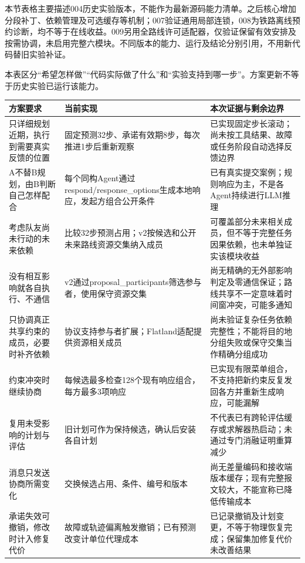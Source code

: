本节表格主要描述004历史实验版本，不能作为最新源码能力清单。之后核心增加分段补丁、依赖管理及可选缓存等机制；007验证通用局部连锁，008为铁路离线预约诊断，均不等于在线收益。009另用全路线许可适配器，仅验证保留有效安排及按需协调，未启用完整六模块。不同版本的能力、运行及结论分别引用，不用新代码替旧实验补证。

本表区分``希望怎样做''``代码实际做了什么''和``实验支持到哪一步''。方案更新不等于历史实验已运行该能力。

\begin{longtable}[]{@{}
  >{\raggedright\arraybackslash}p{}
  >{\raggedright\arraybackslash}p{}
  >{\raggedright\arraybackslash}p{}@{}}
\toprule
方案要求 & 当前实现 & 本次证据与剩余边界 \\
\midrule
\endhead
只详细规划近期，执行到需要真实反馈的位置 &
固定预测32步、承诺有效期8步，每次推进1步后重新观察 &
已实现固定步长滚动；尚未按工具结果、故障或任务阶段自动选择反馈边界 \\
A不替B规划，由B判断自己怎样配合 &
每个同构Agent通过respond/response\_options生成本地响应，发起方组合公开条件 &
已有真实提交案例；规则响应为主，不是各Agent持续进行LLM推理 \\
考虑队友尚未行动的未来依赖 & 比较32步预测占用；v2按候选和公开未来路线资源交集纳入成员
& 可覆盖部分未来相关成员，但不等于完整任务因果依赖，也未单独证实该模块收益 \\
没有相互影响就各自执行、不通信 &
v2通过proposal\_participants筛选参与者，使用保守资源交集 &
尚无精确的无外部影响判定及零通信保证；路线共享不一定意味着时间窗冲突，可能多通知 \\
只协调真正共享约束的成员，必要时补齐依赖 &
协议支持参与者扩展；Flatland适配提供资源相关成员 &
尚未验证复杂任务依赖完整性；不能将目的地分组失败或保守交集当作精确分组成功 \\
约束冲突时继续协商 & 每候选最多检查128个现有响应组合，每方最多3项响应 &
已实现有限菜单组合，不支持把新约束反复发回各方并重新生成响应，可能漏解 \\
复用未受影响的计划与评估 & 旧计划可作为保持候选，确认后安装各自计划 &
不代表已有跨轮评估缓存或求解器热启动；未通过专门消融证明重算减少 \\
消息只发送协商所需变化 & 交换候选占用、条件、编号和版本 &
尚无差量编码和接收端版本缓存；现有完整报文较大，不能宣称已降低传输成本 \\
承诺失效可撤销，修改时计入修复代价 &
故障或轨迹偏离触发撤销；已有预测改变计单位代理成本 &
已记录撤销及计划变更，不等于物理恢复完成；保留集加修复代价未改善结果 \\
\bottomrule
\end{longtable}


